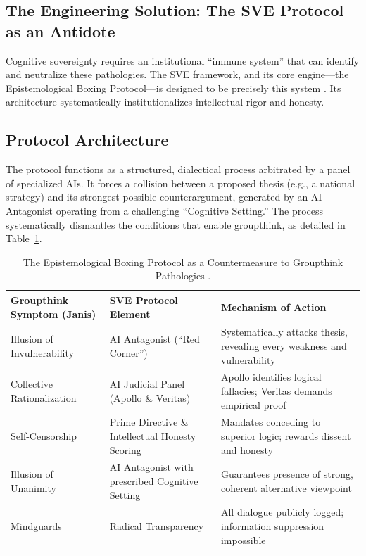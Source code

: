 \documentclass[11pt,a4paper]{article}
\begin{document}
\begin{small}
\section{The Engineering Solution: The SVE Protocol as an Antidote}
Cognitive sovereignty requires an institutional ``immune system'' that can identify and neutralize these pathologies. The SVE framework, and its core engine—the Epistemological Boxing Protocol—is designed to be precisely this system \citep{Kovnatsky2025Boxing}. Its architecture systematically institutionalizes intellectual rigor and honesty.

\subsection{Protocol Architecture}
The protocol functions as a structured, dialectical process arbitrated by a panel of specialized AIs. It forces a collision between a proposed thesis (e.g., a national strategy) and its strongest possible counterargument, generated by an AI Antagonist operating from a challenging ``Cognitive Setting.'' The process systematically dismantles the conditions that enable groupthink, as detailed in Table~\ref{tab:groupthink_antidote}.

\begin{table}[h!]
\centering
\caption{The Epistemological Boxing Protocol as a Countermeasure to Groupthink Pathologies \citep{AnalyticalReport2025}.}
\label{tab:groupthink_antidote}
\begin{tabular}{@{}p{4.5cm}p{4.5cm}p{5cm}@{}}
\toprule
\textbf{Groupthink Symptom (Janis)} & \textbf{SVE Protocol Element} & \textbf{Mechanism of Action} \\ 
\midrule
Illusion of Invulnerability & AI Antagonist (``Red Corner'') & Systematically attacks thesis, revealing every weakness and vulnerability \\
\addlinespace
Collective Rationalization & AI Judicial Panel (Apollo \& Veritas) & Apollo identifies logical fallacies; Veritas demands empirical proof \\
\addlinespace
Self-Censorship & Prime Directive \& Intellectual Honesty Scoring & Mandates conceding to superior logic; rewards dissent and honesty \\
\addlinespace
Illusion of Unanimity & AI Antagonist with prescribed Cognitive Setting & Guarantees presence of strong, coherent alternative viewpoint \\
\addlinespace
Mindguards & Radical Transparency & All dialogue publicly logged; information suppression impossible \\
\bottomrule
\end{tabular}
\end{table}


\end{small}
\end{document}
